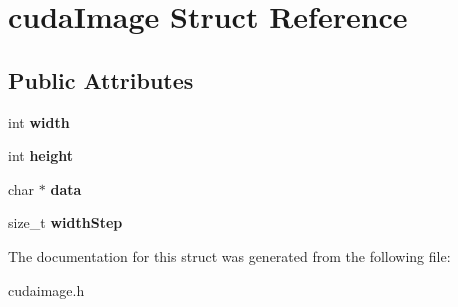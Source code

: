 \hypertarget{structcudaImage}{\section{cuda\-Image Struct Reference}
\label{structcudaImage}
}
\subsection*{Public Attributes}
\begin{DoxyCompactItemize}
\item 
\hypertarget{structcudaImage_a28bf7a9a333e4e631f3f1bd0259851d5}{int {\bfseries width}}\label{structcudaImage_a28bf7a9a333e4e631f3f1bd0259851d5}

\item 
\hypertarget{structcudaImage_a7449428002e66e0f1341644eb5532b1d}{int {\bfseries height}}\label{structcudaImage_a7449428002e66e0f1341644eb5532b1d}

\item 
\hypertarget{structcudaImage_a9b97e901d314d707910158af2393063e}{char $\ast$ {\bfseries data}}\label{structcudaImage_a9b97e901d314d707910158af2393063e}

\item 
\hypertarget{structcudaImage_a2c21305605a0f8c36a5223cc4d2518dc}{size\-\_\-t {\bfseries width\-Step}}\label{structcudaImage_a2c21305605a0f8c36a5223cc4d2518dc}

\end{DoxyCompactItemize}


The documentation for this struct was generated from the following file\-:\begin{DoxyCompactItemize}
\item 
cudaimage.\-h\end{DoxyCompactItemize}
